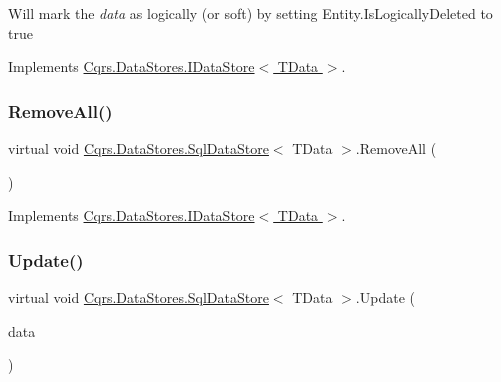 Will mark the {\itshape data}  as logically (or soft) by setting Entity.\+Is\+Logically\+Deleted to true 



Implements \hyperlink{interfaceCqrs_1_1DataStores_1_1IDataStore_a7ef540796bbe4257296841590bc23478}{Cqrs.\+Data\+Stores.\+I\+Data\+Store$<$ T\+Data $>$}.

\mbox{\label{classCqrs_1_1DataStores_1_1SqlDataStore_abb88337dccf3d5372f6b0920d5d26ebd}} 
\subsubsection{\texorpdfstring{Remove\+All()}{RemoveAll()}}
{\footnotesize\ttfamily virtual void \hyperlink{classCqrs_1_1DataStores_1_1SqlDataStore}{Cqrs.\+Data\+Stores.\+Sql\+Data\+Store}$<$ T\+Data $>$.Remove\+All (\begin{DoxyParamCaption}{ }\end{DoxyParamCaption})\hspace{0.3cm}{\ttfamily [virtual]}}



Implements \hyperlink{interfaceCqrs_1_1DataStores_1_1IDataStore_aead8d7a39a717d29af05daf7b64bea94}{Cqrs.\+Data\+Stores.\+I\+Data\+Store$<$ T\+Data $>$}.

\mbox{\label{classCqrs_1_1DataStores_1_1SqlDataStore_a8f85191cecef92d003620d4064584bb2}} 
\subsubsection{\texorpdfstring{Update()}{Update()}}
{\footnotesize\ttfamily virtual void \hyperlink{classCqrs_1_1DataStores_1_1SqlDataStore}{Cqrs.\+Data\+Stores.\+Sql\+Data\+Store}$<$ T\+Data $>$.Update (\begin{DoxyParamCaption}\item[{T\+Data}]{data }\end{DoxyParamCaption})\hspace{0.3cm}{\ttfamily [virtual]}}



